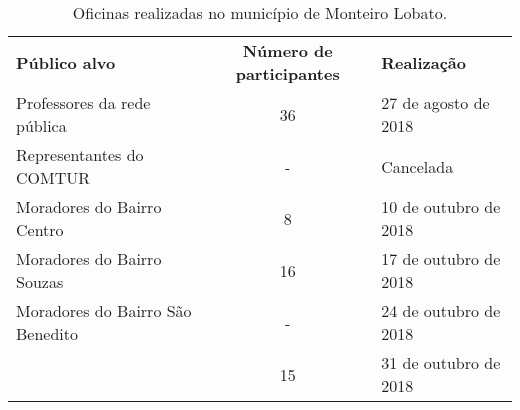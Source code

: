 \begin{table}[htbp]
  \centering
  \caption{Oficinas realizadas no município de Monteiro Lobato.}
    \begin{tabular}{P{17.82em}cP{12.68em}}
     \textcolor[rgb]{ 1,  1,  1}{\textbf{Público alvo}} & \textcolor[rgb]{ 1,  1,  1}{\textbf{Número de participantes}} & \textcolor[rgb]{ 1,  1,  1}{\textbf{Realização}} \\
     Professores da rede pública & 36    & 27 de agosto de 2018 \\
     Representantes do COMTUR & - & Cancelada \\
     Moradores do Bairro Centro & 8     & 10 de outubro de 2018 \\
     Moradores do Bairro Souzas & 16    & 17 de outubro de 2018 \\
     Moradores do Bairro São Benedito & - & 24 de outubro de 2018 \\ 
	  & 15  & 31 de outubro de 2018 \\
    \end{tabular}%
  \label{tab:oficinas}%
\end{table}%
